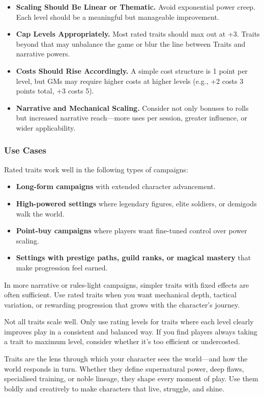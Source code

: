 \begin{itemize}
    \item \textbf{Scaling Should Be Linear or Thematic.} Avoid exponential power creep. Each level should be a meaningful but manageable improvement.
    \item \textbf{Cap Levels Appropriately.} Most rated traits should max out at +3. Traits beyond that may unbalance the game or blur the line between Traits and narrative powers.
    \item \textbf{Costs Should Rise Accordingly.} A simple cost structure is 1 point per level, but GMs may require higher costs at higher levels (e.g., +2 costs 3 points total, +3 costs 5).
    \item \textbf{Narrative and Mechanical Scaling.} Consider not only bonuses to rolls but increased narrative reach—more uses per session, greater influence, or wider applicability.
\end{itemize}

\subsubsection*{Use Cases}
Rated traits work well in the following types of campaigns:

\begin{itemize}
    \item \textbf{Long-form campaigns} with extended character advancement.
    \item \textbf{High-powered settings} where legendary figures, elite soldiers, or demigods walk the world.
    \item \textbf{Point-buy campaigns} where players want fine-tuned control over power scaling.
    \item \textbf{Settings with prestige paths, guild ranks, or magical mastery} that make progression feel earned.
\end{itemize}

In more narrative or rules-light campaigns, simpler traits with fixed effects are often sufficient. Use rated traits when you want mechanical depth, tactical variation, or rewarding progression that grows with the character’s journey.

\begin{GmTips}
    Not all traits scale well. Only use rating levels for traits where each level clearly improves play in a consistent and balanced way. If you find players always taking a trait to maximum level, consider whether it’s too efficient or undercosted.
\end{GmTips}

\vspace{1\baselineskip}
Traits are the lens through which your character sees the world—and how the world responds in turn. Whether they define supernatural power, deep flaws, specialised training, or noble lineage, they shape every moment of play. Use them boldly and creatively to make characters that live, struggle, and shine.


